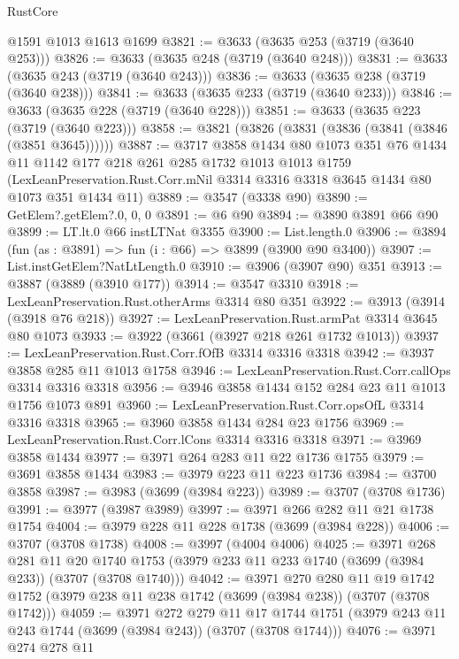 \begin{lexlean}{RustCore}
\begin{coremodule}
    @1591
    @1013
    @1613
    @1699
@3821 := @3633 (@3635 @253 (@3719 (@3640 @253)))
@3826 := @3633 (@3635 @248 (@3719 (@3640 @248)))
@3831 := @3633 (@3635 @243 (@3719 (@3640 @243)))
@3836 := @3633 (@3635 @238 (@3719 (@3640 @238)))
@3841 := @3633 (@3635 @233 (@3719 (@3640 @233)))
@3846 := @3633 (@3635 @228 (@3719 (@3640 @228)))
@3851 := @3633 (@3635 @223 (@3719 (@3640 @223)))
@3858 := @3821 (@3826 (@3831 (@3836 (@3841 (@3846 (@3851 @3645))))))
@3887 := @3717
    @3858
    @1434
    @80
    @1073
    @351
    @76
    @1434
    @11
    @1142
    @177
    @218
    @261
    @285
    @1732
    @1013
    @1013
    @1759
    (LexLeanPreservation.Rust.Corr.mNil @3314 @3316 @3318 @3645 @1434 @80 @1073 @351 @1434 @11)
@3889 := @3547 (@3338 @90)
@3890 := GetElem?.getElem?.{0, 0, 0}
@3891 := @6 @90
@3894 := @3890 @3891 @66 @90
@3899 := LT.lt.{0} @66 instLTNat @3355
@3900 := List.length.{0}
@3906 := @3894 (fun (as : @3891) => fun (i : @66) => @3899 (@3900 @90 @3400))
@3907 := List.instGetElem?NatLtLength.{0}
@3910 := @3906 (@3907 @90) @351
@3913 := @3887 (@3889 (@3910 @177))
@3914 := @3547 @3310
@3918 := LexLeanPreservation.Rust.otherArms @3314 @80 @351
@3922 := @3913 (@3914 (@3918 @76 @218))
@3927 := LexLeanPreservation.Rust.armPat @3314 @3645 @80 @1073
@3933 := @3922 (@3661 (@3927 @218 @261 @1732 @1013))
@3937 := LexLeanPreservation.Rust.Corr.fOfB @3314 @3316 @3318
@3942 := @3937 @3858 @285 @11 @1013 @1758
@3946 := LexLeanPreservation.Rust.Corr.callOps @3314 @3316 @3318
@3956 := @3946 @3858 @1434 @152 @284 @23 @11 @1013 @1756 @1073 @891
@3960 := LexLeanPreservation.Rust.Corr.opsOfL @3314 @3316 @3318
@3965 := @3960 @3858 @1434 @284 @23 @1756
@3969 := LexLeanPreservation.Rust.Corr.lCons @3314 @3316 @3318
@3971 := @3969 @3858 @1434
@3977 := @3971 @264 @283 @11 @22 @1736 @1755
@3979 := @3691 @3858 @1434
@3983 := @3979 @223 @11 @223 @1736
@3984 := @3700 @3858
@3987 := @3983 (@3699 (@3984 @223))
@3989 := @3707 (@3708 @1736)
@3991 := @3977 (@3987 @3989)
@3997 := @3971 @266 @282 @11 @21 @1738 @1754
@4004 := @3979 @228 @11 @228 @1738 (@3699 (@3984 @228))
@4006 := @3707 (@3708 @1738)
@4008 := @3997 (@4004 @4006)
@4025 := @3971
    @268
    @281
    @11
    @20
    @1740
    @1753
    (@3979 @233 @11 @233 @1740 (@3699 (@3984 @233)) (@3707 (@3708 @1740)))
@4042 := @3971
    @270
    @280
    @11
    @19
    @1742
    @1752
    (@3979 @238 @11 @238 @1742 (@3699 (@3984 @238)) (@3707 (@3708 @1742)))
@4059 := @3971
    @272
    @279
    @11
    @17
    @1744
    @1751
    (@3979 @243 @11 @243 @1744 (@3699 (@3984 @243)) (@3707 (@3708 @1744)))
@4076 := @3971
    @274
    @278
    @11

\end{coremodule}
\end{lexlean}
